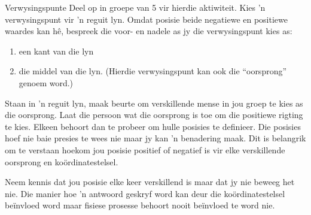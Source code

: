 \begin{groupdiscussion}{Verwysingspunte}
            \nopagebreak
Deel op in groepe van 5 vir hierdie aktiwiteit. Kies 'n verwysingspunt vir 'n reguit lyn. Omdat posisie beide negatiewe en positiewe waardes kan h\^e, bespreek die voor- en nadele as jy die verwysingspunt kies as:
\begin{enumerate}[noitemsep, label=\textbf{\arabic*}. ] 
    \item een kant van die lyn
    \item die middel van die lyn. (Hierdie verwysingspunt kan ook die ``oorsprong'' genoem word.)
\end{enumerate}
Staan in 'n reguit lyn, maak beurte om verskillende mense in jou groep te kies as die oorsprong. Laat die persoon wat die oorsprong is toe om die positiewe rigting te kies. Elkeen behoort dan te probeer om hulle posisies te definieer. Die posisies hoef nie baie presies te wees nie maar jy kan 'n benadering maak. Dit is belangrik om te verstaan hoekom jou posisie positief of negatief is vir elke verskillende oorsprong en ko\-\"or\-di\-na\-te\-stel\-sel.

Neem kennis dat jou posisie elke keer verskillend is maar dat jy nie beweeg het nie. Die manier hoe 'n antwoord geskryf word kan deur die ko\-\"or\-di\-na\-te\-stel\-sel be\"invloed word maar fisiese prosesse behoort nooit be\"invloed te word nie.
\end{groupdiscussion}

